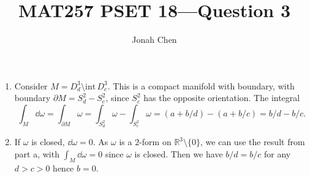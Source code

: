 \documentclass{exam}
\title{MAT257 PSET 18---Question 3}
\author{Jonah Chen}
\date{}
\newcommand{\R}{\mathbb{R}}
\begin{document}
\sffamily
\maketitle
\begin{enumerate}[label=\alph*)]
    \item Consider $M=D^3_d\setminus\mathrm{int}\,D^3_c$. This is a compact manifold with boundary, with boundary $\partial M=S^2_d-S^2_c$, since $S^2_c$ has the opposite orientation. The integral \begin{equation*}
        \int_{M}\dd\omega=\int_{\partial M}\omega=\int_{S^2_d}\omega-\int_{S^2_c}\omega=(a+b/d)-(a+b/c)=b/d-b/c.
    \end{equation*}
    \item If $\omega$ is closed, $\dd\omega=0$. As $\omega$ is a $2$-form on $\R^3\setminus\{0\}$, we can use the result from part a, with $\int_M\dd\omega=0$ since $\omega$ is closed. Then we have $b/d=b/c$ for any $d>c>0$ hence $b=0$.
\end{enumerate}
\end{document}
